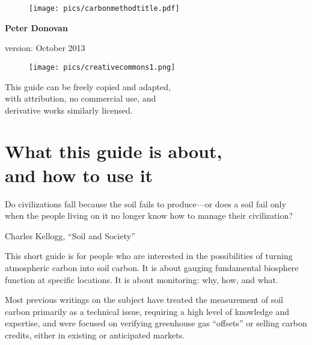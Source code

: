 \documentclass[11pt,letterpaper,oneside,onecolumn]{memoir}
\begin{document}
\renewcommand{\captionfont}{\footnotesize}


\frontmatter
\pagestyle{empty}



\begin{center}

\begin{figure}
\texttt{[image: pics/carbonmethodtitle.pdf]}
\end{figure}

\Large
\bfseries
Peter Donovan
\vspace*{3em}
\footnotesize


version: October 2013
\begin{figure}[h]
\centering
\texttt{[image: pics/creativecommons1.png]}
\end{figure}

This guide can be freely copied and adapted,\\with attribution, no commercial use, and\\derivative works similarly licensed.
\end{center}


\newpage
\thispagestyle{empty}
\setlength{\parindent}{1em}
\setlength{\parskip}{0em}
\normalsize
\setlength{\epigraphwidth}{4in}
\setlength{\epigraphrule}{0pt}
\epigraphfontsize{\small}
\setlength{\beforechapskip}{0em}


\tableofcontents*
\clearpage

\chapter{What this guide is about,\\and how to use it}

\epigraph{Do civilizations fall because the soil fails to produce---or does a soil fail only when the people living on it no longer know how to manage their civilization?}{Charles Kellogg, ``Soil and Society''}

\noindent This short guide is for people who are interested in the possibilities of turning atmospheric carbon into soil carbon. It is about gauging fundamental biosphere function at specific locations. It is about monitoring: why, how, and what.

Most previous writings on the subject have treated the measurement of soil carbon primarily as a technical issue, requiring a high level of knowledge and expertise, and were focused on verifying greenhouse gas ``offsets'' or selling carbon credits, either in existing or anticipated markets.
\end{document}
